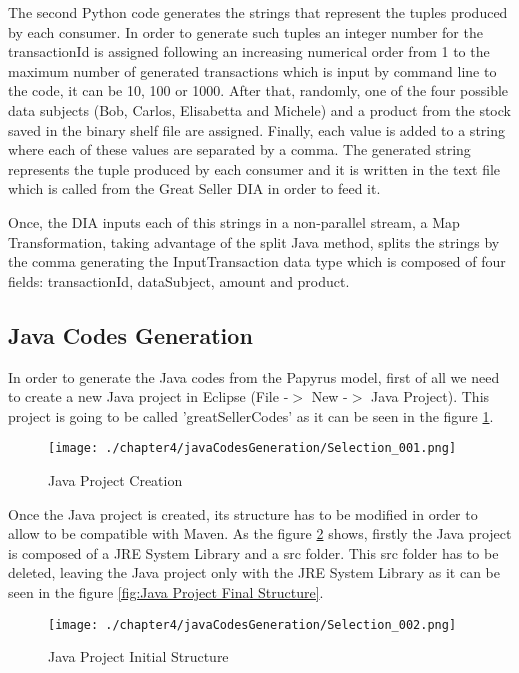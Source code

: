 The second Python code generates the strings that represent the tuples produced by each consumer. In order to generate such tuples an integer number for the transactionId is assigned following an increasing numerical order from 1 to the maximum number of generated transactions which is input by command line to the code, it can be 10, 100 or 1000. After that, randomly, one of the four possible data subjects (Bob, Carlos, Elisabetta and Michele) and a product from the stock saved in the binary shelf file are assigned. Finally, each value is added to a string where each of these values are separated by a comma. The generated string represents the tuple produced by each consumer and it is written in the text file which is called from the Great Seller DIA in order to feed it.

Once, the DIA inputs each of this strings in a non-parallel stream, a Map Transformation, taking advantage of the split Java method, splits the strings by the comma generating the InputTransaction data type which is composed of four fields: transactionId, dataSubject, amount and product.


\subsection{Java Codes Generation}

In order to generate the Java codes from the Papyrus model, first of all we need to create a new Java project in Eclipse (File -$>$ New -$>$ Java Project). This project is going to be called 'greatSellerCodes' as it can be seen in the figure \ref{fig:Java Project Creation}.

\begin{figure}
\centering
{\texttt{[image: ./chapter4/javaCodesGeneration/Selection\_001.png]}}
\caption{Java Project Creation}
\label{fig:Java Project Creation}
\end{figure}

Once the Java project is created, its structure has to be modified in order to allow to be compatible with Maven. As the figure \ref{fig:Java Project Initial Structure} shows, firstly the Java project is composed of a JRE System Library and a src folder. This src folder has to be deleted, leaving the Java project only with the JRE System Library as it can be seen in the figure \ref{fig:Java Project Final Structure}.

\begin{figure}
\centering
{\texttt{[image: ./chapter4/javaCodesGeneration/Selection\_002.png]}}
\caption{Java Project Initial Structure}
\label{fig:Java Project Initial Structure}
\end{figure}

